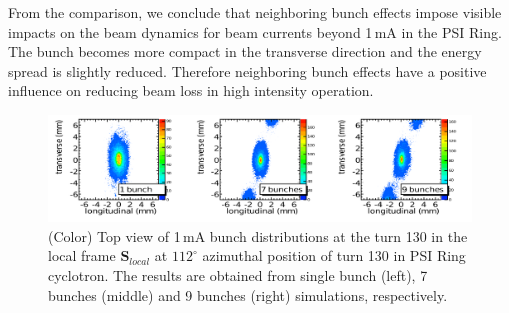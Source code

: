 \documentclass[aps,prstab,twocolumn,superscriptaddress,showpacs]{revtex4}
\newcommand{\bs}[1]{\mathbf #1}
\begin{document}
From the comparison, we conclude that neighboring bunch effects impose visible impacts on the beam dynamics for beam currents beyond 1\,mA in the PSI Ring. 
The bunch becomes more compact in the transverse direction and the energy spread is slightly reduced. Therefore neighboring bunch effects have a positive influence
on reducing beam loss in high intensity operation.

\begin{figure}
  \includegraphics[width=1\linewidth]{figures/C9B7BSB-2D-1mA-130.pdf}
  \caption{(Color) Top view of 1\,mA bunch distributions at the turn 130  in the local frame ${\bs{S}_{local}}$ at $112^\circ$ azimuthal position of turn 130 in PSI Ring cyclotron.
    The results are obtained from single bunch (left), 7 bunches (middle) and 9 bunches (right) simulations, respectively.}
  \label{fig:NBcompare2D}
\end{figure}
\end{document}
